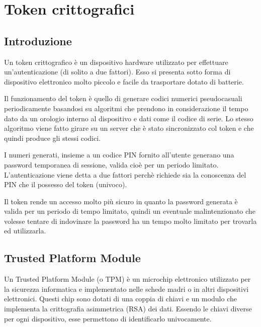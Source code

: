 \chapter{Token crittografici}
\label{chapter3}

\section{Introduzione}
Un token crittografico è un dispositivo hardware utilizzato per effettuare un'autenticazione (di solito a due fattori). Esso si presenta sotto forma di dispositivo elettronico molto piccolo e facile da trasportare dotato di batterie.

Il funzionamento del token è quello di generare codici numerici pseudocasuali periodicamente basandosi su algoritmi che prendono in considerazione il tempo dato da un orologio interno al dispositivo e dati come il codice di serie. Lo stesso algoritmo viene fatto girare su un server che è stato sincronizzato col token e che quindi produce gli stessi codici.

I numeri generati, insieme a un codice PIN fornito all'utente generano una password temporanea di sessione, valida cioè per un periodo limitato. L'autenticazione viene detta a due fattori perchè richiede sia la conoscenza del PIN che il possesso del token (univoco).

Il token rende un accesso molto più sicuro in quanto la password generata è valida per un periodo di tempo limitato, quindi un eventuale malintenzionato che volesse tentare di indovinare la password ha un tempo molto limitato per trovarla ed utilizzarla.
\cite{wiki_token}

\section{Trusted Platform Module}
\label{trusted_platform_module}
Un Trusted Platform Module (o TPM) è un microchip elettronico utilizzato per la sicurezza informatica e implementato nelle schede madri o in altri dispositivi elettronici. Questi chip sono dotati di una coppia di chiavi e un modulo che implementa la crittografia asimmetrica (RSA) dei dati. Essendo le chiavi diverse per ogni dispositivo, esse permettono di identificarlo univocamente.

